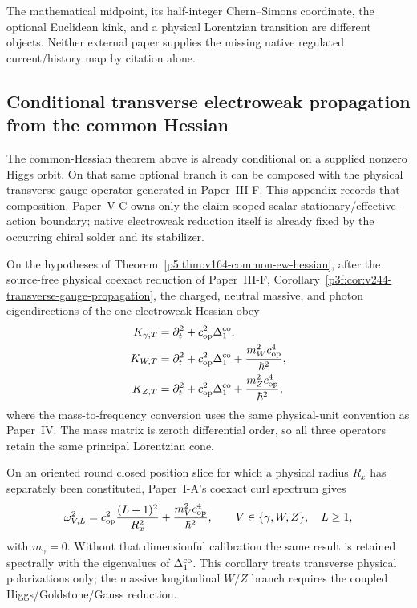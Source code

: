 \documentclass[11pt,a4paper]{article}
\begin{document}
The mathematical midpoint, its half-integer Chern--Simons coordinate,
the optional Euclidean kink, and a physical Lorentzian transition are
different objects. Neither external paper supplies the missing native
regulated current/history map by citation alone.



\label{p5:part:appendices}

\subsection{Conditional transverse electroweak propagation from the common Hessian}
\label{p5:app:v244-transverse-ew-propagation}

The common-Hessian theorem above is already conditional on a supplied nonzero
Higgs orbit.  On that same optional branch it can be composed with the
physical transverse gauge operator generated in Paper~III-F.  This appendix
records that composition.  Paper~V-C owns only the claim-scoped scalar
stationary/effective-action boundary; native electroweak reduction itself is
already fixed by the occurring chiral solder and its stabilizer.

\begin{corollary}
\label{p5:cor:v244-common-hessian-transverse-propagation}
On the hypotheses of
Theorem~\ref{p5:thm:v164-common-ew-hessian}, after the source-free physical
coexact reduction of Paper~III-F,
Corollary~\ref{p3f:cor:v244-transverse-gauge-propagation}, the charged,
neutral massive, and photon eigendirections of the one electroweak Hessian
obey
\begin{align}
 K_{\gamma,T}&=\partial_t^2+c_{\rm op}^2\Delta_1^{\rm co},\\
 K_{W,T}&=\partial_t^2+c_{\rm op}^2\Delta_1^{\rm co}
 +\frac{m_W^2c_{\rm op}^4}{\hbar^2},\\
 K_{Z,T}&=\partial_t^2+c_{\rm op}^2\Delta_1^{\rm co}
 +\frac{m_Z^2c_{\rm op}^4}{\hbar^2},
\end{align}
where the mass-to-frequency conversion uses the same physical-unit convention
as Paper~IV.  The mass matrix is zeroth differential order, so all three
operators retain the same principal Lorentzian cone.

On an oriented round closed position slice for which a physical radius \(R_x\)
has separately been constituted, Paper~I-A's coexact curl spectrum gives
\[
 \omega_{V,L}^2
 =c_{\rm op}^2\frac{(L+1)^2}{R_x^2}
 +\frac{m_V^2c_{\rm op}^4}{\hbar^2},
 \qquad V\in\{\gamma,W,Z\},\quad L\ge1,
\]
with \(m_\gamma=0\).  Without that dimensionful calibration the same result
is retained spectrally with the eigenvalues of \(\Delta_1^{\rm co}\).
This corollary treats transverse physical polarizations only; the massive
longitudinal \(W/Z\) branch requires the coupled Higgs/Goldstone/Gauss
reduction.
\end{corollary}
\end{document}
